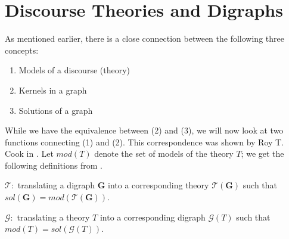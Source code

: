 \section{Discourse Theories and Digraphs}
\label{sec:Discourse Theories and Digraphs}
As mentioned earlier, there is a close connection between the following three concepts:
\begin{enumerate}
  \item Models of a discourse (theory)
  \item Kernels in a graph
  \item Solutions of a graph
\end{enumerate}
While we have the equivalence between (2) and (3), we will now look at two functions connecting (1) and (2).
This correspondence was shown by Roy T. Cook in \cite{cook}.
Let $mod(T)$ denote the set of models of the theory $T$;
we get the following definitions from \cite{apal-digraph}.

$\mathcal{T}:$ translating a digraph \textbf{G} into a corresponding theory $\mathcal{T}(\mathbf{G})$ such that $sol(\mathbf{G}) = mod(\mathcal{T}(\mathbf{G}))$.

$\mathcal{G}:$ translating a theory $T$ into a corresponding digraph $\mathcal{G}(T)$ such that $mod(T) = sol(\mathcal{G}(T))$.

